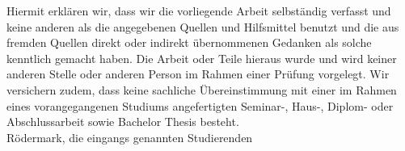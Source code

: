 Hiermit erklären wir, dass wir die vorliegende Arbeit selbständig verfasst und keine anderen als die angegebenen Quellen und Hilfsmittel benutzt und die aus fremden Quellen direkt oder indirekt übernommenen Gedanken als solche kenntlich gemacht haben. Die Arbeit oder Teile hieraus wurde und wird keiner anderen Stelle oder anderen Person im Rahmen einer Prüfung vorgelegt. Wir versichern zudem, dass keine sachliche Übereinstimmung mit einer im Rahmen eines vorangegangenen Studiums angefertigten Seminar-, Haus-, Diplom- oder Abschlussarbeit sowie Bachelor Thesis besteht.
\\ [1.2em]
Rödermark, die eingangs genannten Studierenden
\\ [1.2em]
